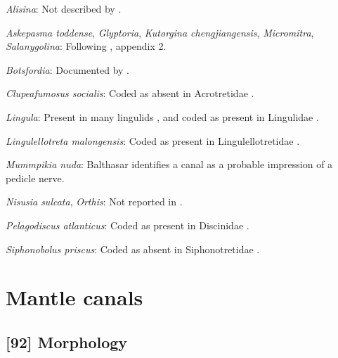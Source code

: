 \documentclass[openany]{book}
\theoremstyle{definition}
\theoremstyle{definition}
\theoremstyle{definition}
\theoremstyle{remark}
\begin{document}
\hypertarget{Alisina-coding-91}{}
\emph{Alisina}: Not described by
\citet{Williams2000LinguliformeaCraniiformea}.

\hypertarget{Askepasma_toddense-coding-91}{}
\emph{Askepasma toddense}, \emph{Glyptoria}, \emph{Kutorgina
chengjiangensis}, \emph{Micromitra}, \emph{Salanygolina}: Following
\citet{Williams1998Thediversity}, appendix 2.

\hypertarget{Botsfordia-coding-91}{}
\emph{Botsfordia}: Documented by \citet{Skovsted2017Depthrelated}.

\hypertarget{Clupeafumosus_socialis-coding-91}{}
\emph{Clupeafumosus socialis}: Coded as absent in Acrotretidae
\citep[table 6]{Williams2000LinguliformeaCraniiformea}.

\hypertarget{Lingula-coding-91}{}
\emph{Lingula}: Present in many lingulids
\citep{Williams2000LinguliformeaCraniiformea}, and coded as present in
Lingulidae \citep[table 6]{Williams2000LinguliformeaCraniiformea}.

\hypertarget{Lingulellotreta_malongensis-coding-91}{}
\emph{Lingulellotreta malongensis}: Coded as present in
Lingulellotretidae \citep[table
6]{Williams2000LinguliformeaCraniiformea}.

\hypertarget{Mummpikia_nuda-coding-91}{}
\emph{Mummpikia nuda}: Balthasar
\citeyearpar[p.~274]{Balthasar2008iMummpikia} identifies a canal as a
probable impression of a pedicle nerve.

\hypertarget{Nisusia_sulcata-coding-91}{}
\emph{Nisusia sulcata}, \emph{Orthis}: Not reported in
\citet{Williams2000LinguliformeaCraniiformea}.

\hypertarget{Pelagodiscus_atlanticus-coding-91}{}
\emph{Pelagodiscus atlanticus}: Coded as present in Discinidae
\citep[table 6]{Williams2000LinguliformeaCraniiformea}.

\hypertarget{Siphonobolus_priscus-coding-91}{}
\emph{Siphonobolus priscus}: Coded as absent in Siphonotretidae
\citep[table 6]{Williams2000LinguliformeaCraniiformea}.

\section{Mantle canals}\label{mantle-canals}

\subsection*{{[}92{]} Morphology}\label{morphology-1}
\end{document}
